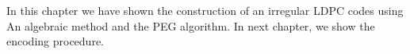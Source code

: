 In this chapter we have shown the construction of an irregular LDPC codes using An algebraic method and the PEG algorithm. In next chapter, we show the encoding procedure.
\begin{comment}
\begin{thebibliography}{99}

\bibitem{irrldpc} Thomas J.~Richardson, M.~Amin Shokrollahi, Member, IEEE, and Rudiger L.~Urbanke. ``Design of Capacity-Approaching Irregular Low-Density Parity-Check Codes'', IEEE Transactions On Information Theory, VOL. $47$, NO.$2$, FEBRUARY $2001$.
\bibitem{Mackay} David J.~c.~Mackay. ``Good Error-Correcting Codes Based on Very Sparse Matrices'', IEEE Transactions On Information Theory, VOL. $45$, NO.$2$, MARCH $1999$.
\bibitem{kou} Y.~Kou, S.~Lin, and M.~Fossorier, ``Low density parity check codes based on finite geometries: A rediscovery and new results'', IEEE Transactions On Information Theory, VOL. $47$, NO.$7$, pp.~$2711-2736$, Nov.~ $2001$.
\bibitem{geometry} Jun Xu, Member, IEEE, Lei Chen, Ivana Djurdjevic, Shu Lin, Life Fellow, IEEE, and Khaled Abdel-Ghaggar, Member, IEEE. ``Construction of Regular and Irregular LDPC codes: Geometry Decomposition and Masking'', IEEE Transactions On Information Theory, VOL. $53$, NO.$1$, January $2007$.
\bibitem{speg} Lam Pham Sy, Valentin Savin, David Declercq, Nghia Pham, Eutelsat, Paris, France, CEA-LETI, MINATEC campus, Grenoble, France, ENSEA, Cergy-Pontoise, France. ``Scheduled-PEG construction of LDPC codes for Upper-Layer FEC''.
\bibitem{PEG} Xiao-Yu Hu, Member, IEEE, Evangelos Eleftheriou, Fellow, IEEE, and Dieter M. ~ Arnold, Member, IEEE. ``Regular and Irregular Progressive Edge-Growth Tanner Graphs'', IEEE Transactions On Information Theory, VOL. $51$, NO.$1$, January $2005$.

\end{thebibliography}



\end{comment}
